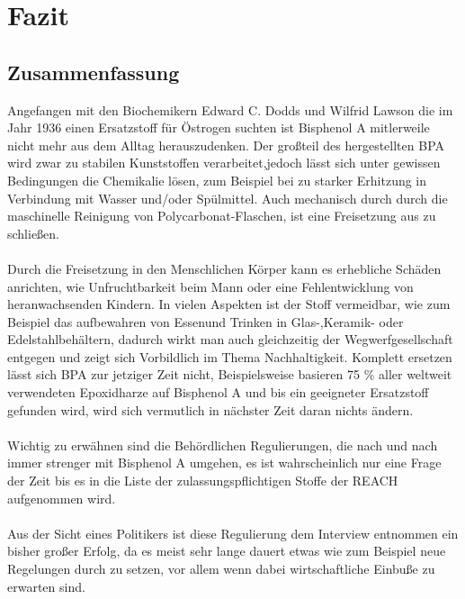 \section{Fazit}
\subsection{Zusammenfassung}
Angefangen mit den Biochemikern Edward C. Dodds und Wilfrid Lawson die im Jahr 1936 einen Ersatzstoff für Östrogen suchten ist Bisphenol A mitlerweile nicht mehr aus dem Alltag herauszudenken. Der großteil des hergestellten BPA wird zwar zu stabilen Kunststoffen verarbeitet,jedoch lässt sich unter gewissen Bedingungen die Chemikalie lösen, zum Beispiel bei zu starker Erhitzung in Verbindung mit Wasser und/oder Spülmittel. Auch mechanisch durch durch die maschinelle Reinigung von Polycarbonat-Flaschen, ist eine Freisetzung aus zu schließen.\\
\\
Durch die Freisetzung in den Menschlichen Körper kann es erhebliche Schäden anrichten, wie Unfruchtbarkeit beim Mann oder eine Fehlentwicklung von heranwachsenden Kindern. In vielen Aspekten ist der Stoff vermeidbar, wie zum Beispiel das aufbewahren von Essenund Trinken in Glas-,Keramik- oder Edelstahlbehältern, dadurch wirkt man auch gleichzeitig der \glqq Wegwerfgesellschaft\grqq{} entgegen und zeigt sich Vorbildlich im Thema Nachhaltigkeit. Komplett ersetzen lässt sich BPA zur jetziger Zeit nicht, Beispielsweise basieren 75 \% aller weltweit verwendeten Epoxidharze auf Bisphenol A \cite{Epoxidharz} und bis ein geeigneter Ersatzstoff gefunden wird, wird sich vermutlich in nächster Zeit daran nichts ändern.\\
\\
Wichtig zu erwähnen sind die Behördlichen Regulierungen, die nach und nach immer strenger mit Bisphenol A umgehen, es ist wahrscheinlich nur eine Frage der Zeit bis es in die Liste der zulassungspflichtigen Stoffe der REACH aufgenommen wird.\\
\\
Aus der Sicht eines Politikers ist diese Regulierung dem Interview entnommen ein bisher großer Erfolg, da es meist sehr lange dauert etwas wie zum Beispiel neue Regelungen durch zu setzen, vor allem wenn dabei wirtschaftliche Einbuße zu erwarten sind.\\
